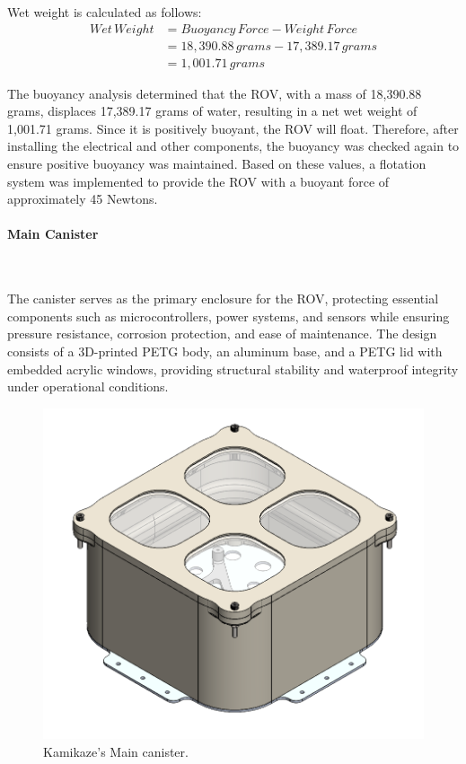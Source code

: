 Wet weight is calculated as follows:
\vspace{-0.7\baselineskip}
\[
\begin{aligned}
    Wet \, Weight &= Buoyancy \, Force - Weight \, Force \\
    &= 18,390.88 \, grams - 17,389.17 \, grams \\
    &= 1,001.71 \, grams
\end{aligned}
\]

The buoyancy analysis determined that the ROV, with a mass of 18,390.88 grams, displaces 17,389.17 grams of water, resulting in a net wet weight of 1,001.71 grams. Since it is positively buoyant, the ROV will float. Therefore, after installing the electrical and other components, the buoyancy was checked again to ensure positive buoyancy was maintained. Based on these values, a flotation system was implemented to provide the ROV with a buoyant force of approximately 45 Newtons.

\vspace{-0.3cm}
\paragraph{Main Canister} \ \\
\vspace{-0.5cm}

The canister serves as the primary enclosure for the ROV, protecting essential components such as microcontrollers, power systems, and sensors while ensuring pressure resistance, corrosion protection, and ease of maintenance. The design consists of a 3D-printed PETG body, an aluminum base, and a PETG lid with embedded acrylic windows, providing structural stability and waterproof integrity under operational conditions.

\begin{figure}[h]
    \centering
    \includegraphics[width=0.6\columnwidth]{Sections/2Design Rationale/images/canister.png}
    \caption{Kamikaze’s Main canister.}
    \label{fig:canister}
\end{figure}

